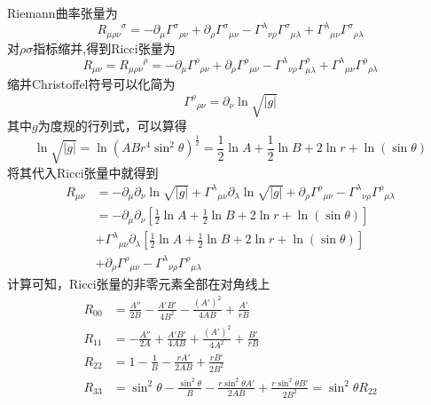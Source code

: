         Riemann曲率张量为
        \begin{equation}
            {R_{\mu\rho\nu}}^\sigma=-\partial_\mu{\varGamma^\sigma}_{\rho\nu}+\partial_\rho{\varGamma^\sigma}_{\mu\nu}-{\varGamma^\lambda}_{\nu\rho}{\varGamma^\sigma}_{\mu\lambda}+{\varGamma^\lambda}_{\mu\nu}{\varGamma^\sigma}_{\rho\lambda}
        \end{equation}
        对$\rho\sigma$指标缩并,得到Ricci张量为
        \begin{equation}
            R_{\mu\nu}={R_{\mu\rho\nu}}^\rho=-\partial_\mu{\varGamma^\rho}_{\rho\nu}+\partial_\rho{\varGamma^\rho}_{\mu\nu}-{\varGamma^\lambda}_{\nu\rho}\varGamma^\rho_{\mu\lambda}+{\varGamma^\lambda}_{\mu\nu}{\varGamma^\rho}_{\rho\lambda}
        \end{equation}
        缩并Christoffel符号可以化简为
        \begin{equation}
            {\varGamma^\rho}_{\rho\nu}=\partial_\nu \ln \sqrt{|g|}
        \end{equation}
        其中$g$为度规的行列式，可以算得
        \begin{equation}
            \ln \sqrt{|g|}=\ln (ABr^4\sin^2\theta)^\frac{1}{2}=\frac{1}{2}\ln A+\frac{1}{2}\ln B+2\ln r+\ln (\sin\theta)
        \end{equation}
        将其代入Ricci张量中就得到
        \begin{equation}
            \begin{split}
                    R_{\mu\nu}&=-\partial_\mu\partial_\nu \ln \sqrt{|g|}+{\varGamma^\lambda}_{\mu\nu}\partial_\lambda \ln \sqrt{|g|}+\partial_\rho{\varGamma^\rho}_{\mu\nu}-{\varGamma^\lambda}_{\nu\rho}{\varGamma^\rho}_{\mu\lambda}\\
                    &=-\partial_\mu\partial_\nu \left[\frac{1}{2}\ln A+\frac{1}{2}\ln B+2\ln r+\ln (\sin\theta)\right]\\
                    &+{\varGamma^\lambda}_{\mu\nu}\partial_\lambda \left[\frac{1}{2}\ln A+\frac{1}{2}\ln B+2\ln r+\ln (\sin\theta)\right]\\
                    &+\partial_\rho{\varGamma^\rho}_{\mu\nu}-{\varGamma^\lambda}_{\nu\rho}{\varGamma^\rho}_{\mu\lambda}
            \end{split}
        \end{equation}
        计算可知，Ricci张量的非零元素全部在对角线上
        \begin{equation}
            \begin{split}
                    R_{00}&=\frac{A''}{2B}-\frac{A'B'}{4B^2}-\frac{(A')^2}{4AB}+\frac{A'}{rB}\\
                    R_{11}&=-\frac{A''}{2A}+\frac{A'B'}{4AB}+\frac{(A')^2}{4A^2}+\frac{B'}{rB}\\
                    R_{22}&=1-\frac{1}{B}-\frac{rA'}{2AB}+\frac{rB'}{2B^2}\\
                    R_{33}&=\sin^2\theta-\frac{\sin^2\theta}{B}-\frac{r\sin^2\theta A'}{2AB}+\frac{r\sin^2\theta B'}{2B^2}=\sin^2\theta R_{22}
            \end{split}
        \end{equation}
